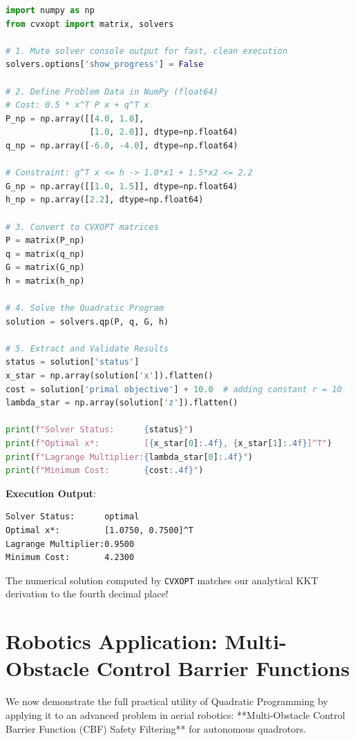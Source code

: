 \documentclass[11pt,a4paper]{article}
\begin{document}
\begin{lstlisting}[language=Python, caption={Solving the 2D Constrained QP with CVXOPT}]
import numpy as np
from cvxopt import matrix, solvers

# 1. Mute solver console output for fast, clean execution
solvers.options['show_progress'] = False

# 2. Define Problem Data in NumPy (float64)
# Cost: 0.5 * x^T P x + q^T x
P_np = np.array([[4.0, 1.0], 
                 [1.0, 2.0]], dtype=np.float64)
q_np = np.array([-6.0, -4.0], dtype=np.float64)

# Constraint: g^T x <= h -> 1.0*x1 + 1.5*x2 <= 2.2
G_np = np.array([[1.0, 1.5]], dtype=np.float64)
h_np = np.array([2.2], dtype=np.float64)

# 3. Convert to CVXOPT matrices
P = matrix(P_np)
q = matrix(q_np)
G = matrix(G_np)
h = matrix(h_np)

# 4. Solve the Quadratic Program
solution = solvers.qp(P, q, G, h)

# 5. Extract and Validate Results
status = solution['status']
x_star = np.array(solution['x']).flatten()
cost = solution['primal objective'] + 10.0  # adding constant r = 10
lambda_star = np.array(solution['z']).flatten()

print(f"Solver Status:      {status}")
print(f"Optimal x*:         [{x_star[0]:.4f}, {x_star[1]:.4f}]^T")
print(f"Lagrange Multiplier:{lambda_star[0]:.4f}")
print(f"Minimum Cost:       {cost:.4f}")
\end{lstlisting}

\textbf{Execution Output}:
\begin{verbatim}
Solver Status:      optimal
Optimal x*:         [1.0750, 0.7500]^T
Lagrange Multiplier:0.9500
Minimum Cost:       4.2300
\end{verbatim}
The numerical solution computed by \texttt{CVXOPT} matches our analytical KKT derivation to the fourth decimal place!

\section{Robotics Application: Multi-Obstacle Control Barrier Functions}

We now demonstrate the full practical utility of Quadratic Programming by applying it to an advanced problem in aerial robotics: **Multi-Obstacle Control Barrier Function (CBF) Safety Filtering** for autonomous quadrotors.
\end{document}
